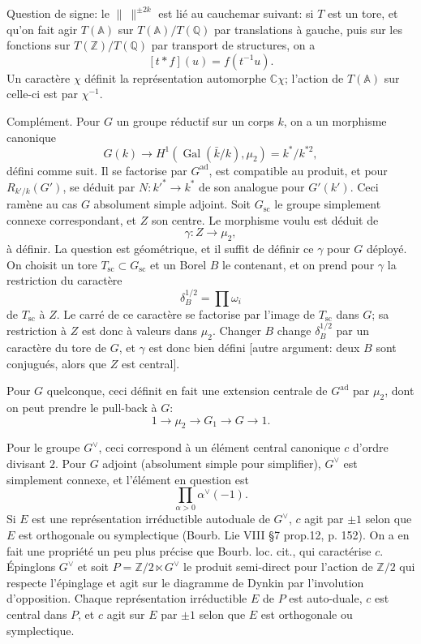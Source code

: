 \documentclass[11pt]{article}
\newcommand{\Gal}{\operatorname{Gal}}
\newcommand{\A}{\mathbb A}
\newcommand{\normchar}{\|\ \|}
\begin{document}
Question de signe: le \(\normchar^{\pm2k}\) est lié au cauchemar suivant: si \(T\) est un tore, et qu'on fait agir \(T(\A)\) sur \(T(\A)/T(\mathbb Q)\) par translations à gauche, puis sur les fonctions sur \(T(\mathbb Z)/T(\mathbb Q)\) par transport de structures, on a
\[
[t\ast f](u)=f(t^{-1}u).
\]
Un caractère \(\chi\) définit la représentation automorphe \(\mathbb C\chi\); l'action de \(T(\A)\) sur celle-ci est par \(\chi^{-1}\).

Complément. Pour \(G\) un groupe réductif sur un corps \(k\), on a un morphisme canonique
\[
G(k)\longrightarrow H^1(\Gal(\bar k/k),\mu_2)=k^\ast/k^{\ast2},
\]
défini comme suit. Il se factorise par \(G^{\mathrm{ad}}\), est compatible au produit, et pour \(R_{k'/k}(G')\), se déduit par \(N:k'^\ast\to k^\ast\) de son analogue pour \(G'(k')\). Ceci ramène au cas \(G\) absolument simple adjoint. Soit \(G_{\mathrm{sc}}\) le groupe simplement connexe correspondant, et \(Z\) son centre. Le morphisme voulu est déduit de
\[
\gamma:Z\longrightarrow \mu_2,
\]
à définir. La question est géométrique, et il suffit de définir ce \(\gamma\) pour \(G\) déployé. On choisit un tore \(T_{\mathrm{sc}}\subset G_{\mathrm{sc}}\) et un Borel \(B\) le contenant, et on prend pour \(\gamma\) la restriction du caractère
\[
\delta_B^{1/2}=\prod \omega_i
\]
de \(T_{\mathrm{sc}}\) à \(Z\). Le carré de ce caractère se factorise par l'image de \(T_{\mathrm{sc}}\) dans \(G\); sa restriction à \(Z\) est donc à valeurs dans \(\mu_2\). Changer \(B\) change \(\delta_B^{1/2}\) par un caractère du tore de \(G\), et \(\gamma\) est donc bien défini [autre argument: deux \(B\) sont conjugués, alors que \(Z\) est central].

Pour \(G\) quelconque, ceci définit en fait une extension centrale de \(G^{\mathrm{ad}}\) par \(\mu_2\), dont on peut prendre le pull-back à \(G\):
\[
1\longrightarrow \mu_2\longrightarrow G_1\longrightarrow G\longrightarrow 1.
\]

Pour le groupe \(G^\vee\), ceci correspond à un élément central canonique \(c\) d'ordre divisant \(2\). Pour \(G\) adjoint (absolument simple pour simplifier), \(G^\vee\) est simplement connexe, et l'élément en question est
\[
\prod_{\alpha>0}\alpha^\vee(-1).
\]
Si \(E\) est une représentation irréductible autoduale de \(G^\vee\), \(c\) agit par \(\pm1\) selon que \(E\) est orthogonale ou symplectique (Bourb. Lie VIII \S7 prop.12, p. 152). On a en fait une propriété un peu plus précise que Bourb. loc. cit., qui caractérise \(c\). Épinglons \(G^\vee\) et soit \(P=\mathbb Z/2\ltimes G^\vee\) le produit semi-direct pour l'action de \(\mathbb Z/2\) qui respecte l'épinglage et agit sur le diagramme de Dynkin par l'involution d'opposition. Chaque représentation irréductible \(E\) de \(P\) est auto-duale, \(c\) est central dans \(P\), et \(c\) agit sur \(E\) par \(\pm1\) selon que \(E\) est orthogonale ou symplectique.
\end{document}

